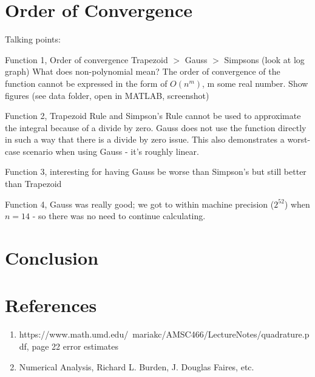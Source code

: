 \documentclass[12pt]{article}
\begin{document}
\section{Order of Convergence}

Talking points:

Function 1, Order of convergence Trapezoid $>$ Gauss $>$ Simpsons (look at log graph)
What does non-polynomial mean? The order of convergence of the function cannot be
expressed in the form of $O(n^m)$, m some real number. Show figures (see data folder,
open in MATLAB, screenshot)

Function 2, Trapezoid Rule and Simpson's Rule cannot be used to approximate the integral
because of a divide by zero. Gauss does not use the function directly in such a way
that there is a divide by zero issue. This also demonstrates a worst-case scenario 
when using Gauss - it's roughly linear. 

Function 3, interesting for having Gauss be worse than Simpson's but still better than
Trapezoid

Function 4, Gauss was really good; we got to within machine precision ($2^52$) when $n = 14$ - so
there was no need to continue calculating.

\section{Conclusion}

\newpage
\section{References}

\begin{enumerate}
    \item https://www.math.umd.edu/~mariakc/AMSC466/LectureNotes/quadrature.pdf, page 22 error estimates
    \item Numerical Analysis, Richard L. Burden, J. Douglas Faires, etc.
\end{enumerate}
\end{document}
